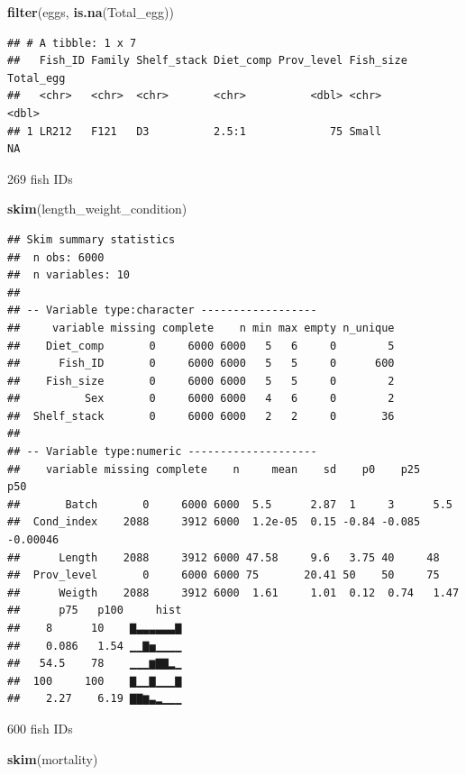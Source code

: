 \documentclass[]{book}
\newenvironment{Shaded}{\begin{snugshade}}{\end{snugshade}}
\newcommand{\KeywordTok}[1]{\textcolor[rgb]{0.13,0.29,0.53}{\textbf{#1}}}
\newcommand{\NormalTok}[1]{#1}
\begin{document}
\begin{Shaded}
\begin{Highlighting}[]
\KeywordTok{filter}\NormalTok{(eggs, }\KeywordTok{is.na}\NormalTok{(Total_egg))}
\end{Highlighting}
\end{Shaded}

\begin{verbatim}
## # A tibble: 1 x 7
##   Fish_ID Family Shelf_stack Diet_comp Prov_level Fish_size Total_egg
##   <chr>   <chr>  <chr>       <chr>          <dbl> <chr>         <dbl>
## 1 LR212   F121   D3          2.5:1             75 Small            NA
\end{verbatim}

269 fish IDs

\begin{Shaded}
\begin{Highlighting}[]
\KeywordTok{skim}\NormalTok{(length_weight_condition)}
\end{Highlighting}
\end{Shaded}

\begin{verbatim}
## Skim summary statistics
##  n obs: 6000 
##  n variables: 10 
## 
## -- Variable type:character ------------------
##     variable missing complete    n min max empty n_unique
##    Diet_comp       0     6000 6000   5   6     0        5
##      Fish_ID       0     6000 6000   5   5     0      600
##    Fish_size       0     6000 6000   5   5     0        2
##          Sex       0     6000 6000   4   6     0        2
##  Shelf_stack       0     6000 6000   2   2     0       36
## 
## -- Variable type:numeric --------------------
##    variable missing complete    n     mean    sd    p0    p25      p50
##       Batch       0     6000 6000  5.5      2.87  1     3      5.5    
##  Cond_index    2088     3912 6000  1.2e-05  0.15 -0.84 -0.085 -0.00046
##      Length    2088     3912 6000 47.58     9.6   3.75 40     48      
##  Prov_level       0     6000 6000 75       20.41 50    50     75      
##      Weigth    2088     3912 6000  1.61     1.01  0.12  0.74   1.47   
##      p75   p100     hist
##    8      10    ▇▃▃▃▃▃▃▇
##    0.086   1.54 ▁▁▇▅▁▁▁▁
##   54.5    78    ▁▁▁▆▇▇▂▁
##  100     100    ▇▁▁▇▁▁▁▇
##    2.27    6.19 ▇▇▆▃▂▁▁▁
\end{verbatim}

600 fish IDs

\begin{Shaded}
\begin{Highlighting}[]
\KeywordTok{skim}\NormalTok{(mortality)}
\end{Highlighting}
\end{Shaded}
\end{document}
